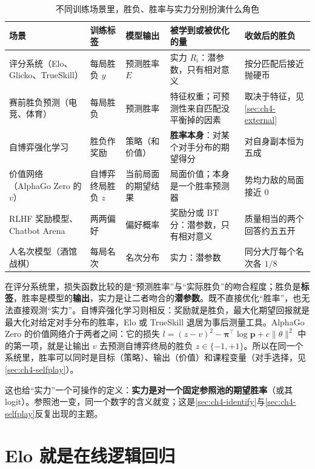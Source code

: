 \begin{table}[htbp]
\centering
\caption{不同训练场景里，胜负、胜率与实力分别扮演什么角色}
\label{tab:ch4-roles}
\small
\begin{tabularx}{\linewidth}{>{\raggedright\arraybackslash}p{2.6cm}>{\raggedright\arraybackslash}p{1.8cm}>{\raggedright\arraybackslash}p{2.0cm}>{\raggedright\arraybackslash}X>{\raggedright\arraybackslash}p{2.6cm}}
\toprule
场景 & 训练标签 & 模型输出 & 被学到或被优化的量 & 收敛后的胜负 \\
\midrule
评分系统（Elo、Glicko、TrueSkill） & 每局胜负 $y$ & 预测胜率 $E$ & 实力 $R_i$：潜参数，只有相对意义 & 按分匹配后接近抛硬币 \\
赛前胜负预测（电竞、体育） & 每局胜负 & 预测胜率 & 特征权重；可预测性来自匹配没平衡掉的因素 & 取决于特征，见\cref{sec:ch4-external} \\
自博弈强化学习 & 胜负作奖励 & 策略（和价值） & \textbf{胜率本身}：对某个对手分布的期望得分 & 对自身副本恒为五成 \\
价值网络（AlphaGo Zero 的 $v$） & 自博弈终局胜负 $z$ & 当前局面的期望结果 & 局面价值；本身是一个胜率预测器 & 势均力敌的局面接近 0 \\
RLHF 奖励模型、Chatbot Arena & 两两偏好 & 偏好概率 & 奖励分或 BT 分：潜参数，只有相对意义 & 质量相当的两个回答约五五开 \\
8 人名次模型（酒馆战棋） & 每局名次 & 名次分布 & 实力：潜参数 & 同分大厅每个名次各 $1/8$ \\
\bottomrule
\end{tabularx}
\end{table}

在评分系统里，损失函数比较的是“预测胜率”与“实际胜负”的吻合程度；胜负是\textbf{标签}，胜率是模型的\textbf{输出}，实力是让二者吻合的\textbf{潜参数}。既不直接优化“胜率”，也无法直接观测“实力”。自博弈强化学习则相反：奖励就是胜负，最大化期望回报就是最大化对给定对手分布的胜率，Elo 或 TrueSkill 退居为事后测量工具。AlphaGo Zero 的价值网络介于两者之间：它的损失 $l=(z-v)^2-\bm\pi^{\top}\log\bm p+c\|\theta\|^2$ 中的第一项，就是让输出 $v$ 去预测自博弈终局的胜负 $z\in\{-1,+1\}$\cite{silver2017mastering}\tagLit。所以在同一个系统里，胜率可以同时是目标（策略）、输出（价值）和课程变量（对手选择，见\cref{sec:ch4-selfplay}）。

这也给“实力”一个可操作的定义：\textbf{实力是对一个固定参照池的期望胜率}（或其 logit）。参照池一变，同一个数字的含义就变；这是\cref{sec:ch4-identify}与\cref{sec:ch4-selfplay}反复出现的主题。

\section{Elo 就是在线逻辑回归}
\label{sec:ch4-sgd}

